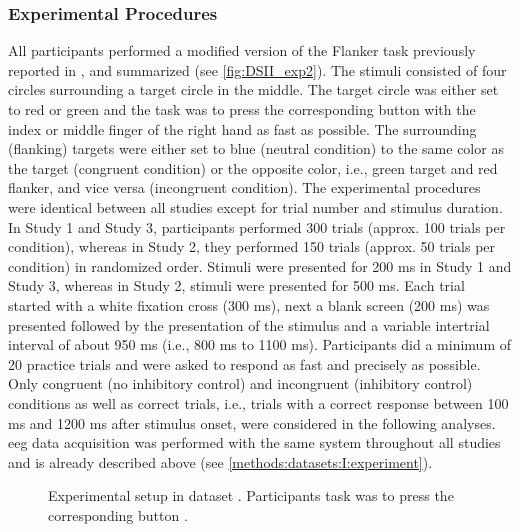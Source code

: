 \subsubsection{Experimental Procedures}
All participants performed a modified version of the Flanker task previously reported in \cite{Reuter2017, Winneke2012, Winneke2019}, and summarized \cite{Reuter2019} (see \autoref{fig:DSII_exp2}). The stimuli consisted of four circles surrounding a target circle in the middle. The target circle was either set to red or green and the task was to press the corresponding button with the index or middle finger of the right hand as fast as possible. The surrounding (flanking) targets were either set to blue (neutral condition) to the same color as the target (congruent condition) or the opposite color, i.e., green target and red flanker, and vice versa (incongruent condition). The experimental procedures were identical between all studies except for trial number and stimulus duration. In Study 1 and Study 3, participants performed 300 trials (approx. 100 trials per condition), whereas in Study 2, they performed 150 trials (approx. 50 trials per condition) in randomized order. Stimuli were presented for 200 ms in Study 1 and Study 3, whereas in Study 2, stimuli were presented for 500 ms. Each trial started with a white fixation cross (300 ms), next a blank screen (200 ms) was presented followed by the presentation of the stimulus and a variable intertrial interval of about 950 ms (i.e., 800 ms to 1100 ms). Participants did a minimum of 20 practice trials and were asked to respond as fast and precisely as possible. Only congruent (no inhibitory control) and incongruent (inhibitory control) conditions as well as correct trials, i.e., trials with a correct response between 100 ms and 1200 ms after stimulus onset, were considered in the following analyses.\\
\Gls{eeg} data acquisition was performed with the same system throughout all studies and is already described above (see \autoref{methods:datasets:I:experiment}). 

\begin{figure}[h]
\begin{center}

\caption[Experimental setup in dataset .]{Experimental setup in dataset . Participants task was to press the corresponding button .}
\label{fig:DSII_exp2}
\end{center}
\end{figure}

